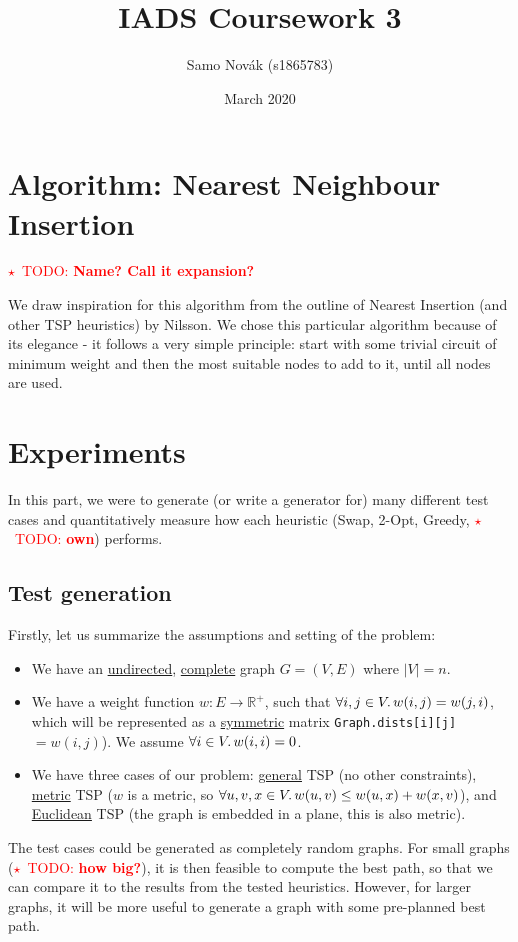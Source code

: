 \documentclass{article}
\title{IADS Coursework 3}
\author{Samo Nov\'ak (s1865783)}
\date{March 2020}
\newcommand{\todo}[1]{\textcolor{red}{$\star$~TODO: \textbf{#1}}}
\newcommand{\R}{\mathbb{R}}
\newcommand{\bb}[1]{\textbf{#1}}
\newcommand{\uu}[1]{\underline{#1}}
\newcommand{\py}[1]{\lstinline[language=Python]{#1}}
\begin{document}
\maketitle

\section{Algorithm: Nearest Neighbour Insertion}

\todo{Name? Call it \bb{expansion}?}

We draw inspiration for this algorithm from the outline of Nearest Insertion
(and other TSP heuristics) by Nilsson\cite{nilsson}. We chose this particular
algorithm because of its elegance - it follows a very simple principle:
start with some trivial circuit of minimum weight and then the most suitable
nodes to add to it, until all nodes are used.


\section{Experiments}

In this part, we were to generate (or write a generator for) many different
test cases and quantitatively measure how each heuristic (Swap, 2-Opt,
Greedy, \todo{own}) performs.

\subsection{Test generation}

Firstly, let us summarize the assumptions and setting of the problem:
\begin{itemize}
\item We have an \uu{undirected}, \uu{complete} graph $G=(V,E)$ where $|V|=n$.
\item We have a weight function $w:E\to\R^{+}$, such that
  $\forall i,j\in V \ldotp w(i,j) = w(j,i)$, which will be represented as
  a \uu{symmetric} matrix \py{Graph.dists[i][j]}\,$= w(i,j)$).
  We assume $\forall i\in V\ldotp w(i,i)=0$.
\item We have three cases of our problem: \uu{general} TSP
  (no other constraints), \uu{metric} TSP ($w$ is a metric, so
  $\forall u,v,x\in V\ldotp w(u,v)\le w(u,x) + w(x,v)$), and
  \uu{Euclidean} TSP (the graph is embedded in a plane, this is also metric).
\end{itemize}

The test cases could be generated as completely random graphs. For small graphs
(\todo{how big?}), it is then feasible to compute the best path, so that we can
compare it to the results from the tested heuristics. However, for larger graphs,
it will be more useful to generate a graph with some pre-planned best path.
\end{document}
